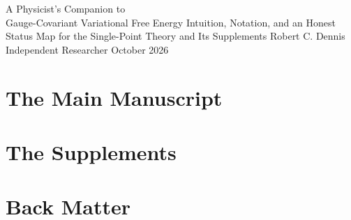 \documentclass[11pt,letterpaper]{report}
\begin{document}
\hypersetup{pageanchor=false}
\makereporttitle
  {A Physicist's Companion to\\Gauge-Covariant Variational Free Energy}
  {Intuition, Notation, and an Honest Status Map for the Single-Point Theory and Its Supplements}
  {Robert C. Dennis}
  {Independent Researcher}
  {October 2026}

\hypersetup{pageanchor=true}
\tableofcontents
\clearpage
{}




\part{The Main Manuscript}










\part{The Supplements}





\part{Back Matter}





\end{document}
